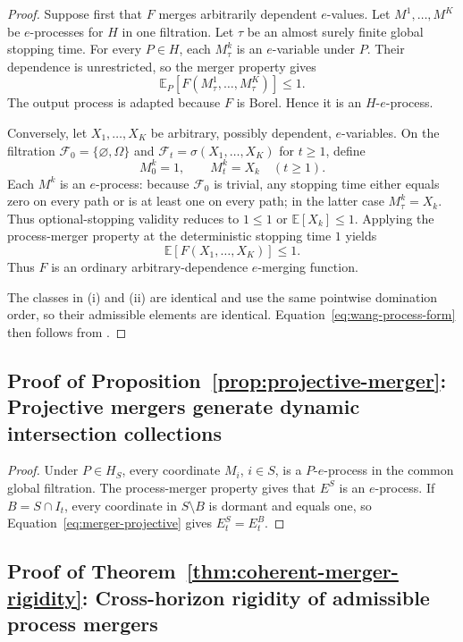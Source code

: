 \documentclass[11pt]{article}
\numberwithin{equation}{section}
\theoremstyle{plain}
\theoremstyle{definition}
\newcommand{\E}{\mathbb E}
\newcommand{\F}{\mathcal F}
\begin{document}
\begin{proof}
Suppose first that $F$ merges arbitrarily dependent $e$-values. Let $M^1,\ldots,M^K$ be $e$-processes for $H$ in one filtration. Let $\tau$ be an almost surely finite global stopping time. For every $P\in H$, each $M_\tau^k$ is an $e$-variable under $P$. Their dependence is unrestricted, so the merger property gives
\[
  \E_P\!\left[F(M_\tau^1,\ldots,M_\tau^K)\right]\leq1.
\]
The output process is adapted because $F$ is Borel. Hence it is an $H$-$e$-process.

Conversely, let $X_1,\ldots,X_K$ be arbitrary, possibly dependent, $e$-variables. On the filtration $\F_0=\{\varnothing,\Omega\}$ and $\F_t=\sigma(X_1,\ldots,X_K)$ for $t\geq1$, define
\[
  M_0^k=1,\qquad M_t^k=X_k\quad(t\geq1).
\]
Each $M^k$ is an $e$-process: because $\F_0$ is trivial, any stopping time either equals zero on every path or is at least one on every path; in the latter case $M_\tau^k=X_k$. Thus optional-stopping validity reduces to $1\leq1$ or $\E[X_k]\leq1$. Applying the process-merger property at the deterministic stopping time $1$ yields
\[
  \E[F(X_1,\ldots,X_K)]\leq1.
\]
Thus $F$ is an ordinary arbitrary-dependence $e$-merging function.

The classes in (i) and (ii) are identical and use the same pointwise domination order, so their admissible elements are identical. Equation~\eqref{eq:wang-process-form} then follows from \citet[Theorem~1]{Wang2025Merging}.
\end{proof}

\subsection{Proof of Proposition~\ref{prop:projective-merger}: Projective mergers generate dynamic intersection collections}\label{app:proof-projective-merger}

\begin{proof}
Under $P\in H_S$, every coordinate $M_i$, $i\in S$, is a $P$-$e$-process in the common global filtration. The process-merger property gives that $E^S$ is an $e$-process. If $B=S\cap I_t$, every coordinate in $S\setminus B$ is dormant and equals one, so Equation~\eqref{eq:merger-projective} gives $E_t^S=E_t^B$.
\end{proof}

\subsection{Proof of Theorem~\ref{thm:coherent-merger-rigidity}: Cross-horizon rigidity of admissible process mergers}\label{app:proof-rigidity}
\end{document}
